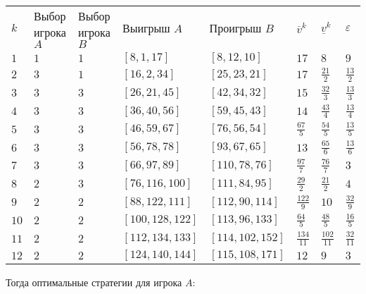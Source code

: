 \documentclass[11pt]{article}
\makeatletter
\newcommand{\boxspacing}{\kern\kvtcb@left@rule\kern\kvtcb@boxsep}
\newcommand{\prompt}[4]{
        \ttfamily\llap{{\color{#2}[#3]:\hspace{3pt}#4}}\vspace{-\baselineskip}
    }
\makeatother
\begin{document}
            \begin{tcolorbox}[breakable, size=fbox, boxrule=.5pt, pad at break*=1mm, opacityfill=0]
\prompt{Out}{outcolor}{18}{\boxspacing}
\begin{tabular}{llllllll}
    $k$ & Выбор игрока $A$ & Выбор игрока $B$ & Выигрыш $A$ & Проигрыш $B$ & $\overline{v}^{k}$ & $\underline{v}^{k}$ & $\varepsilon$ \\
    $1$ & $1$ & $1$ & $\left[8, 1, 17\right]$ & $\left[8, 12, 10\right]$ & $17$ & $8$ & $9$ \\
    $2$ & $3$ & $1$ & $\left[16, 2, 34\right]$ & $\left[25, 23, 21\right]$ & $17$ & $\frac{21}{2}$ & $\frac{13}{2}$ \\
    $3$ & $3$ & $3$ & $\left[26, 21, 45\right]$ & $\left[42, 34, 32\right]$ & $15$ & $\frac{32}{3}$ & $\frac{13}{3}$ \\
    $4$ & $3$ & $3$ & $\left[36, 40, 56\right]$ & $\left[59, 45, 43\right]$ & $14$ & $\frac{43}{4}$ & $\frac{13}{4}$ \\
    $5$ & $3$ & $3$ & $\left[46, 59, 67\right]$ & $\left[76, 56, 54\right]$ & $\frac{67}{5}$ & $\frac{54}{5}$ & $\frac{13}{5}$ \\
    $6$ & $3$ & $3$ & $\left[56, 78, 78\right]$ & $\left[93, 67, 65\right]$ & $13$ & $\frac{65}{6}$ & $\frac{13}{6}$ \\
    $7$ & $3$ & $3$ & $\left[66, 97, 89\right]$ & $\left[110, 78, 76\right]$ & $\frac{97}{7}$ & $\frac{76}{7}$ & $3$ \\
    $8$ & $2$ & $3$ & $\left[76, 116, 100\right]$ & $\left[111, 84, 95\right]$ & $\frac{29}{2}$ & $\frac{21}{2}$ & $4$ \\
    $9$ & $2$ & $2$ & $\left[88, 122, 111\right]$ & $\left[112, 90, 114\right]$ & $\frac{122}{9}$ & $10$ & $\frac{32}{9}$ \\
    $10$ & $2$ & $2$ & $\left[100, 128, 122\right]$ & $\left[113, 96, 133\right]$ & $\frac{64}{5}$ & $\frac{48}{5}$ & $\frac{16}{5}$ \\
    $11$ & $2$ & $2$ & $\left[112, 134, 133\right]$ & $\left[114, 102, 152\right]$ & $\frac{134}{11}$ & $\frac{102}{11}$ & $\frac{32}{11}$ \\
    $12$ & $2$ & $2$ & $\left[124, 140, 144\right]$ & $\left[115, 108, 171\right]$ & $12$ & $9$ & $3$ \\
    \end{tabular}
\end{tcolorbox}
        
    Тогда оптимальные стратегии для игрока \(A\):
\end{document}
